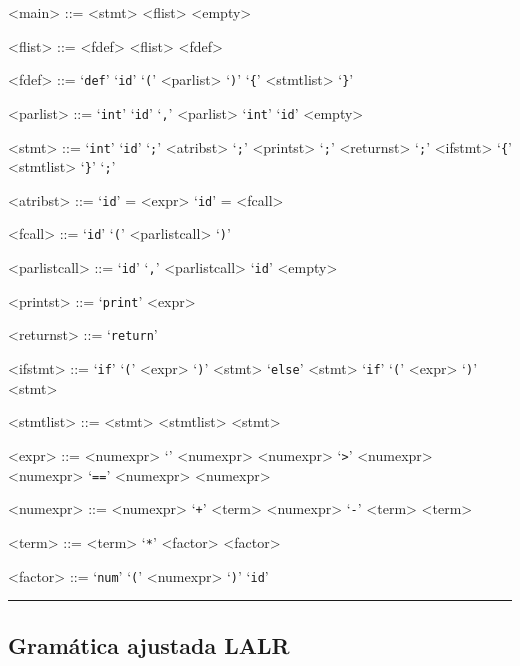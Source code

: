 \documentclass[12pt]{article}
\begin{document}
\begin{multicols}{2}
\raggedcolumns
\setlength{\columnseprule}{0.2pt}
\begin{grammar}
<main> ::= <stmt>
  \alt <flist>
  \alt <empty>

<flist> ::= <fdef> <flist>
  \alt <fdef>

<fdef> ::= ‘\texttt{def}’ ‘\texttt{id}’ ‘\texttt{(}’ <parlist> ‘\texttt{)}’ ‘\texttt{\{}’ <stmtlist> ‘\texttt{\}}’

<parlist> ::= ‘\texttt{int}’ ‘\texttt{id}’ ‘\texttt{,}’ <parlist>
  \alt ‘\texttt{int}’ ‘\texttt{id}’
  \alt <empty>

<stmt> ::= ‘\texttt{int}’ ‘\texttt{id}’ ‘\texttt{;}’
  \alt <atribst> ‘\texttt{;}’
  \alt <printst> ‘\texttt{;}’
  \alt <returnst> ‘\texttt{;}’
  \alt <ifstmt>
  \alt ‘\texttt{\{}’ <stmtlist> ‘\texttt{\}}’
  \alt ‘\texttt{;}’

<atribst> ::= ‘\texttt{id}’ = <expr>
  \alt ‘\texttt{id}’ = <fcall>

<fcall> ::= ‘\texttt{id}’ ‘\texttt{(}’ <parlistcall> ‘\texttt{)}’

<parlistcall> ::= ‘\texttt{id}’ ‘\texttt{,}’ <parlistcall>
  \alt ‘\texttt{id}’
  \alt <empty>

<printst> ::= ‘\texttt{print}’ <expr>

<returnst> ::= ‘\texttt{return}’

<ifstmt> ::= ‘\texttt{if}’ ‘\texttt{(}’ <expr> ‘\texttt{)}’ <stmt> ‘\texttt{else}’ <stmt>
  \alt ‘\texttt{if}’ ‘\texttt{(}’ <expr> ‘\texttt{)}’ <stmt>

<stmtlist> ::= <stmt> <stmtlist>
  \alt <stmt>

<expr> ::= <numexpr> ‘\texttt{}’ <numexpr>
  \alt <numexpr> ‘\texttt{>}’ <numexpr>
  \alt <numexpr> ‘\texttt{==}’ <numexpr>
  \alt <numexpr>

<numexpr> ::= <numexpr> ‘\texttt{+}’ <term>
  \alt <numexpr> ‘\texttt{-}’ <term>
  \alt <term>

<term> ::= <term> ‘\texttt{*}’ <factor>
  \alt <factor>

<factor> ::= ‘\texttt{num}’
  \alt ‘\texttt{(}’ <numexpr> ‘\texttt{)}’
  \alt ‘\texttt{id}’
\end{grammar}
\end{multicols}

\noindent\rule{\textwidth}{0.2pt}

\newpage
\subsection{Gramática ajustada LALR}
\end{document}
